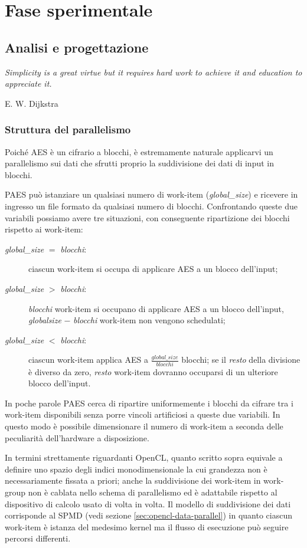 \documentclass[12pt,a4paper,oneside]{book}
\begin{document}
\part{Fase sperimentale}

\chapter{Analisi e progettazione}
\linespread{1}
\epigraph{\textit{Simplicity is a great virtue but it requires hard work to achieve it and education to appreciate it.}}{E. W. Dijkstra}
\linespread{1.3}
\section{Struttura del parallelismo}
\label{sec:paes-parallelism}

Poiché \ac{AES} è un cifrario a blocchi, è estremamente naturale applicarvi un parallelismo sui dati che sfrutti proprio la suddivisione dei dati di input in blocchi.

PAES può istanziare un qualsiasi numero di work-item (\textit{global\_size}) e ricevere in ingresso un file formato da qualsiasi numero di blocchi. Confrontando queste due variabili possiamo avere tre situazioni, con conseguente ripartizione dei blocchi rispetto ai work-item:

\begin{description}
\item[\textit{global\_size} $=$ \textit{blocchi}:] ciascun work-item si occupa di applicare \ac{AES} a un blocco dell'input;
\item[\textit{global\_size} $>$ \textit{blocchi}:] \textit{blocchi} work-item si occupano di applicare \ac{AES} a un blocco dell'input, \textit{globalsize} $-$ \textit{blocchi} work-item non vengono schedulati;
\item[\textit{global\_size} $<$ \textit{blocchi}:] ciascun work-item applica \ac{AES} a $\frac{global\_size}{blocchi}$ blocchi; se il \textit{resto} della divisione è diverso da zero, \textit{resto} work-item dovranno occuparsi di un ulteriore blocco dell'input.
\end{description}

In poche parole PAES cerca di ripartire uniformemente i blocchi da cifrare tra i work-item disponibili senza porre vincoli artificiosi a queste due variabili. In questo modo è possibile dimensionare il numero di work-item a seconda delle peculiarità dell'hardware a disposizione.

In termini strettamente riguardanti \ac{OpenCL}, quanto scritto sopra equivale a definire uno spazio degli indici monodimensionale la cui grandezza non è necessariamente fissata a priori; anche la suddivisione dei work-item in work-group non è cablata nello schema di parallelismo ed è adattabile rispetto al dispositivo di calcolo usato di volta in volta. Il modello di suddivisione dei dati corrisponde al \ac{SPMD} (vedi sezione \ref{sec:opencl-data-parallel}) in quanto ciascun work-item è istanza del medesimo kernel ma il flusso di esecuzione può seguire percorsi differenti.
\end{document}
